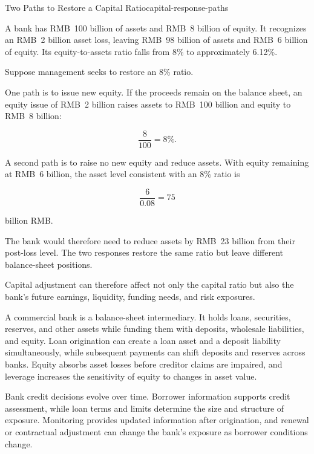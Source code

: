 \begin{example}{Two Paths to Restore a Capital Ratio}{capital-response-paths}

A bank has RMB~100 billion of assets and RMB~8 billion of equity. It recognizes an RMB~2 billion asset loss, leaving RMB~98 billion of assets and RMB~6 billion of equity. Its equity-to-assets ratio falls from 8\% to approximately 6.12\%.

Suppose management seeks to restore an 8\% ratio.

One path is to issue new equity. If the proceeds remain on the balance sheet, an equity issue of RMB~2 billion raises assets to RMB~100 billion and equity to RMB~8 billion:

\[
\frac{8}{100}=8\%.
\]

A second path is to raise no new equity and reduce assets. With equity remaining at RMB~6 billion, the asset level consistent with an 8\% ratio is

\[
\frac{6}{0.08}=75
\]

billion RMB.

The bank would therefore need to reduce assets by RMB~23 billion from their post-loss level. The two responses restore the same ratio but leave different balance-sheet positions.

\end{example}

Capital adjustment can therefore affect not only the capital ratio but also the bank's future earnings, liquidity, funding needs, and risk exposures.



A commercial bank is a balance-sheet intermediary. It holds loans, securities, reserves, and other assets while funding them with deposits, wholesale liabilities, and equity. Loan origination can create a loan asset and a deposit liability simultaneously, while subsequent payments can shift deposits and reserves across banks. Equity absorbs asset losses before creditor claims are impaired, and leverage increases the sensitivity of equity to changes in asset value.

Bank credit decisions evolve over time. Borrower information supports credit assessment, while loan terms and limits determine the size and structure of exposure. Monitoring provides updated information after origination, and renewal or contractual adjustment can change the bank's exposure as borrower conditions change.

